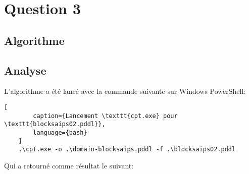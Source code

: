 \documentclass[../CSC_5RO16_TA_TP5.tex]{subfiles}
\begin{document}
\section{Question 3}
% 

\subsection{Algorithme}

\begin{scriptsize}\mycode
    
\end{scriptsize}

\subsection{Analyse}

\noindent L'algorithme a été lancé avec la commande suivante sur Windows PowerShell:

\begin{scriptsize}\mycode
	\begin{lstlisting}[
        caption={Lancement \texttt{cpt.exe} pour \texttt{blocksaips02.pddl}},
        language={bash}
    ]
    .\cpt.exe -o .\domain-blocksaips.pddl -f .\blocksaips02.pddl
    \end{lstlisting}
\end{scriptsize}

\noindent Qui a retourné comme résultat le suivant:
\end{document}
